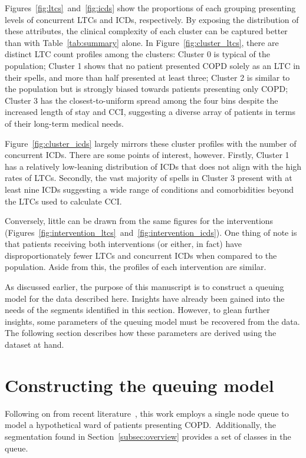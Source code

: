 \documentclass[]{interact}
\theoremstyle{plain}%
\theoremstyle{definition}
\theoremstyle{remark}
\begin{document}
Figures~\ref{fig:ltcs}~and~\ref{fig:icds} show the proportions of each grouping
presenting levels of concurrent LTCs and ICDs, respectively. By exposing the
distribution of these attributes, the clinical complexity of each cluster can be
captured better than with Table~\ref{tab:summary} alone. In
Figure~\ref{fig:cluster_ltcs}, there are distinct LTC count profiles among the
clusters: Cluster 0 is typical of the population; Cluster 1 shows that no
patient presented COPD solely as an LTC in their spells, and more than half
presented at least three; Cluster 2 is similar to the population but is strongly
biased towards patients presenting only COPD; Cluster 3 has the
closest-to-uniform spread among the four bins despite the increased length of
stay and CCI, suggesting a diverse array of patients in terms of their long-term
medical needs.

Figure~\ref{fig:cluster_icds} largely mirrors these cluster profiles with the
number of concurrent ICDs. There are some points of interest, however. Firstly,
Cluster 1 has a relatively low-leaning distribution of ICDs that does not align
with the high rates of LTCs. Secondly, the vast majority of spells in Cluster
3 present with at least nine ICDs suggesting a wide range of conditions and
comorbidities beyond the LTCs used to calculate CCI.\

Conversely, little can be drawn from the same figures for the interventions
(Figures~\ref{fig:intervention_ltcs}~and~\ref{fig:intervention_icds}). One thing
of note is that patients receiving both interventions (or either, in fact) have
disproportionately fewer LTCs and concurrent ICDs when compared to the
population. Aside from this, the profiles of each intervention are similar.

As discussed earlier, the purpose of this manuscript is to construct a queuing
model for the data described here. Insights have already been gained into the
needs of the segments identified in this section. However, to glean further 
insights, some parameters of the queuing model must be recovered from the data.
The following section describes how these parameters are derived using the
dataset at hand.


\section{Constructing the queuing model}\label{sec:model}

Following on from recent literature~\citep{Steins2013,Williams2015}, this work
employs a single node queue to model a hypothetical ward of patients presenting
COPD.\ Additionally, the segmentation found in Section~\ref{subsec:overview}
provides a set of classes in the queue.
\end{document}
